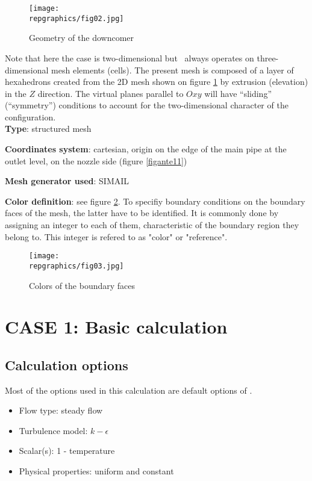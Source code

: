 \begin{figure}[h!]
\begin{center}
\texttt{[image: \\repgraphics/fig02.jpg]} 
\caption{Geometry of the downcomer}
\label{figante12}
\end{center}
\end{figure}

Note that here the case is two-dimensional but \CS\ always operates on three-dimensional 
mesh elements (cells). The present mesh is composed of a layer of hexahedrons
created from the 2D mesh shown on figure \ref{figante12} by
extrusion (elevation) in the $Z$ direction. The virtual planes 
parallel to $Oxy$ will have ``sliding'' (``symmetry'') conditions to account for
the two-dimensional character of the configuration.\\ 
 
{\bfseries Type}: structured mesh

{\bfseries Coordinates system}: cartesian, origin on the edge of the main
pipe at the outlet level, on the nozzle side (figure \ref{figante11})

{\bfseries Mesh generator used}: SIMAIL

{\bfseries Color definition}: see figure \ref{figante13}. To specifiy boundary
conditions on the boundary faces of the mesh, the latter have to be
identified. It is commonly done by assigning an integer to each of them,
characteristic of the boundary region they belong to. This integer is refered to
as "color" or "reference".
  
\begin{figure}[ht]
\begin{center}
\texttt{[image: \\repgraphics/fig03.jpg]} 
\caption{Colors of the boundary faces}
\label{figante13}
\end{center}
\end{figure}


\section{CASE 1: Basic calculation}

	\subsection{Calculation options}

Most of the options used in this calculation are default options of \CS.
\begin{itemize}
\renewcommand{\labelitemi}{$\rightarrow$}
	\item Flow type: steady flow
	\item Turbulence model: $k-\epsilon$
	\item Scalar(s): 1 - temperature
	\item Physical properties: uniform and constant
\end{itemize}


